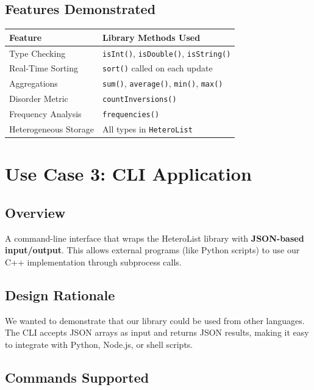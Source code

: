 \documentclass[11pt,a4paper]{article}
\begin{document}
\subsection{Features Demonstrated}

\begin{center}
\begin{tabular}{|l|p{8cm}|}
\hline
\textbf{Feature} & \textbf{Library Methods Used} \\
\hline
Type Checking & \texttt{isInt()}, \texttt{isDouble()}, \texttt{isString()} \\
Real-Time Sorting & \texttt{sort()} called on each update \\
Aggregations & \texttt{sum()}, \texttt{average()}, \texttt{min()}, \texttt{max()} \\
Disorder Metric & \texttt{countInversions()} \\
Frequency Analysis & \texttt{frequencies()} \\
Heterogeneous Storage & All types in \texttt{HeteroList} \\
\hline
\end{tabular}
\end{center}

\section{Use Case 3: CLI Application}

\subsection{Overview}

A command-line interface that wraps the HeteroList library with \textbf{JSON-based input/output}. This allows external programs (like Python scripts) to use our C++ implementation through subprocess calls.

\subsection{Design Rationale}

We wanted to demonstrate that our library could be used from other languages. The CLI accepts JSON arrays as input and returns JSON results, making it easy to integrate with Python, Node.js, or shell scripts.

\subsection{Commands Supported}
\end{document}
